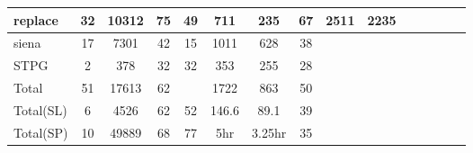 \begin{table}
\begin{CodeOut}
\begin{center}
\begin {tabular} {|l|c|c|c|c|c|c|c|c|c|c|c|c|c|c|}
\hline
replace	&32		&		10312	&	75	&	49		&		711	& 235	&		67	& 2511& 2235\\ \hline
siena		&17		&		7301	&	42	&	15	&		1011	& 628&	38	&&		\\ \hline
STPG		&2		&		378		&	32	&	32		&		353	&	255	& 28 &&\\ \hline
Total		&51		&		17613	&	62		&			&		1722	&		863	& 50 &&\\
\hline
Total(SL)&		6		&4526			&62		&52			&146.6&	89.1	&39&&\\
\hline

Total(SP)&    10      &49889		&68		&77			&5hr			&3.25hr	&35&&\\
\hline


\end{tabular}
\end{center}
\end{CodeOut}
\end{table}
